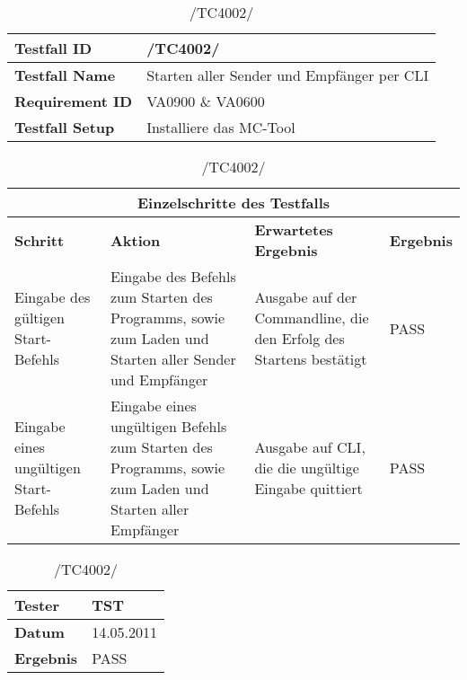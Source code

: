 \begin{table}[h]
    \caption{/TC4002/}
    \label{tab:TC4002}
    \begin{center}
        \begin{tabular}{|p{3.5cm}|p{11cm}|}
            \hline
                \textbf{Testfall ID} & /TC4002/\\
            \hline
                \textbf{Testfall Name} & Starten aller Sender und Empfänger per
                CLI\\
            \hline
                \textbf{Requirement ID} & VA0900 \& VA0600\\
            \hline
                \textbf{Testfall Setup} & Installiere das MC-Tool\\
            \hline
        \end{tabular}
        \begin{tabular}{|p{2cm}|p{3.9cm}|p{3.9cm}|p{3.8cm}|}
            \multicolumn{4}{|c|}{\textbf{Einzelschritte des Testfalls}} \\
            \hline
                \textbf{Schritt} & \textbf{Aktion} & \textbf{Erwartetes
                Ergebnis} & \textbf{Ergebnis}\\
            \hline
                Eingabe des gültigen Start-Befehls & Eingabe des Befehls zum
                Starten des Programms, sowie zum Laden und Starten aller Sender
                und Empfänger & Ausgabe auf der Commandline, die den Erfolg des
                Startens bestätigt & PASS \\
            \hline
                Eingabe eines ungültigen Start-Befehls & Eingabe eines
                ungültigen Befehls zum Starten des Programms, sowie zum Laden
                und Starten aller Empfänger & Ausgabe auf CLI, die die ungültige
                Eingabe quittiert & PASS \\
            \hline
        \end{tabular}
        \begin{tabular}{|p{3.5cm}|p{11cm}|}
                \textbf{Tester} & TST\\
            \hline
                \textbf{Datum} & 14.05.2011\\
            \hline
                \textbf{Ergebnis} & PASS\\
            \hline
        \end{tabular}
    \end{center}
\end{table}

